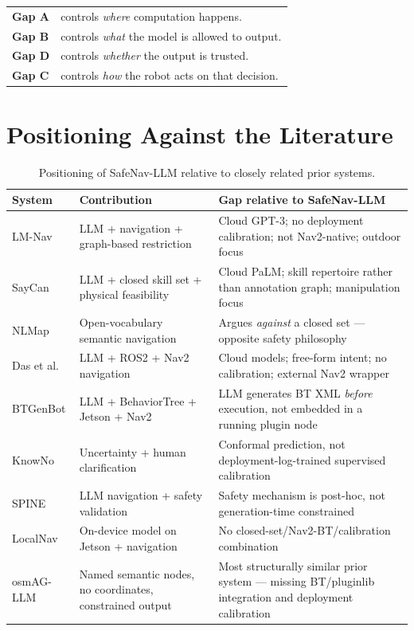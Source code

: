 \documentclass[11pt,a4paper]{article}
\begin{document}
\begin{center}
\begin{tabular}{ll}
\textbf{Gap A} & controls \emph{where} computation happens. \\
\textbf{Gap B} & controls \emph{what} the model is allowed to output. \\
\textbf{Gap D} & controls \emph{whether} the output is trusted. \\
\textbf{Gap C} & controls \emph{how} the robot acts on that decision. \\
\end{tabular}
\end{center}

\section{Positioning Against the Literature}
\label{sec:lit}

\begin{table}[h!]
\centering
\small
\begin{tabular}{@{}p{2.3cm}p{5.3cm}p{5.5cm}@{}}
\toprule
\textbf{System} & \textbf{Contribution} & \textbf{Gap relative to SafeNav-LLM} \\
\midrule
LM-Nav & LLM + navigation + graph-based restriction & Cloud GPT-3; no deployment calibration; not Nav2-native; outdoor focus \\
SayCan & LLM + closed skill set + physical feasibility & Cloud PaLM; skill repertoire rather than annotation graph; manipulation focus \\
NLMap & Open-vocabulary semantic navigation & Argues \emph{against} a closed set --- opposite safety philosophy \\
Das et al. & LLM + ROS2 + Nav2 navigation & Cloud models; free-form intent; no calibration; external Nav2 wrapper \\
BTGenBot & LLM + BehaviorTree + Jetson + Nav2 & LLM generates BT XML \emph{before} execution, not embedded in a running plugin node \\
KnowNo & Uncertainty + human clarification & Conformal prediction, not deployment-log-trained supervised calibration \\
SPINE & LLM navigation + safety validation & Safety mechanism is post-hoc, not generation-time constrained \\
LocalNav & On-device model on Jetson + navigation & No closed-set/Nav2-BT/calibration combination \\
osmAG-LLM & Named semantic nodes, no coordinates, constrained output & Most structurally similar prior system --- missing BT/pluginlib integration and deployment calibration \\
\bottomrule
\end{tabular}
\caption{Positioning of SafeNav-LLM relative to closely related prior systems.}
\end{table}
\end{document}
